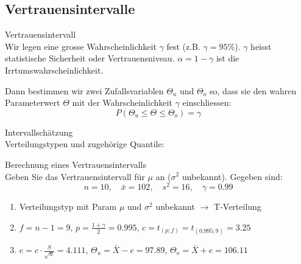 \subsection{Vertrauensintervalle}
\begin{definition}{Vertrauensintervall}\\
Wir legen eine grosse Wahrscheinlichkeit $\gamma$ fest (z.B. $\gamma=95\%$). $\gamma$ heisst statistische Sicherheit oder Vertrauensniveau. $\alpha=1-\gamma$ ist die Irrtumswahrscheinlichkeit.

Dann bestimmen wir zwei Zufallsvariablen $\Theta_u$ und $\Theta_o$ so, dass sie den wahren Parameterwert $\Theta$ mit der Wahrscheinlichkeit $\gamma$ einschliessen:
$$
P(\Theta_u \leq \Theta \leq \Theta_o)=\gamma
$$
\end{definition}

\begin{concept}{Intervallschätzung}\\
Verteilungstypen und zugehörige Quantile:
\begin{center}
\end{center}
\end{concept}

\begin{example}{Berechnung eines Vertrauensintervalls}\\
Geben Sie das Vertrauensintervall für $\mu$ an ($\sigma^2$ unbekannt). Gegeben sind:
$$
n=10, \quad \bar{x}=102, \quad s^2=16, \quad \gamma=0.99
$$

\begin{enumerate}
  \item Verteilungstyp mit Param $\mu$ und $\sigma^2$ unbekannt $\rightarrow$ T-Verteilung
  \item $f=n-1=9$, $p=\frac{1+\gamma}{2}=0.995$, $c=t_{(p;f)}=t_{(0.995;9)}=3.25$
  \item $e=c \cdot \frac{S}{\sqrt{n}}=4.111$, $\Theta_u=\bar{X}-e=97.89$, $\Theta_o=\bar{X}+e=106.11$
\end{enumerate}
\end{example}

